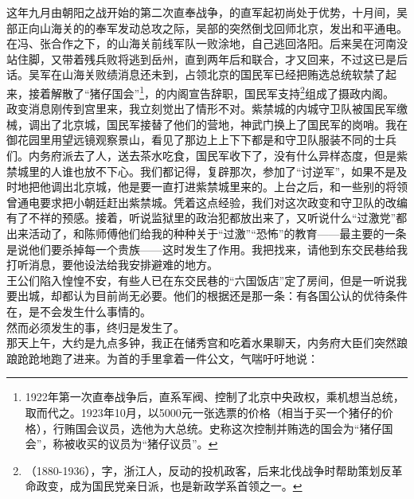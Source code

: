 这年九月由朝阳之战开始的第二次直奉战争，的直军起初尚处于优势，十月间，吴部正向山海关的的奉军发动总攻之际，吴部的突然倒戈回师北京，发出和平通电。在冯、张合作之下，的山海关前线军队一败涂地，自己逃回洛阳。后来吴在河南没站住脚，又带着残兵败将逃到岳州，直到两年后和联合，才又回来，不过这已是后话。吴军在山海关败绩消息还未到，占领北京的国民军已经把贿选总统软禁了起来，接着解散了“猪仔国会”\footnote{1922年第一次直奉战争后，直系军阀、控制了北京中央政权，乘机想当总统，取而代之。1923年10月，以5000元一张选票的价格（相当于买一个猪仔的价格），行贿国会议员，选他为大总统。史称这次控制并贿选的国会为“猪仔国会”，称被收买的议员为“猪仔议员”。}，的内阁宣告辞职，国民军支持\footnote{（1880-1936），字，浙江人，反动的投机政客，后来北伐战争时帮助策划反革命政变，成为国民党亲日派，也是新政学系首领之一。}组成了摄政内阁。\\

政变消息刚传到宫里来，我立刻觉出了情形不对。紫禁城的内城守卫队被国民军缴械，调出了北京城，国民军接替了他们的营地，神武门换上了国民军的岗哨。我在御花园里用望远镜观察景山，看见了那边上上下下都是和守卫队服装不同的士兵们。内务府派去了人，送去茶水吃食，国民军收下了，没有什么异样态度，但是紫禁城里的人谁也放不下心。我们都记得，复辟那次，参加了“讨逆军”，如果不是及时地把他调出北京城，他是要一直打进紫禁城里来的。上台之后，和一些别的将领曾通电要求把小朝廷赶出紫禁城。凭着这点经验，我们对这次政变和守卫队的改编有了不祥的预感。接着，听说监狱里的政治犯都放出来了，又听说什么“过激党”都出来活动了，和陈师傅他们给我的种种关于“过激”“恐怖”的教育——最主要的一条是说他们要杀掉每一个贵族——这时发生了作用。我把找来，请他到东交民巷给我打听消息，要他设法给我安排避难的地方。\\

王公们陷入惶惶不安，有些人已在东交民巷的“六国饭店”定了房间，但是一听说我要出城，却都认为目前尚无必要。他们的根据还是那一条：有各国公认的优待条件在，是不会发生什么事情的。\\

然而必须发生的事，终归是发生了。\\

那天上午，大约是九点多钟，我正在储秀宫和吃着水果聊天，内务府大臣们突然踉踉跄跄地跑了进来。为首的手里拿着一件公文，气喘吁吁地说：\\


